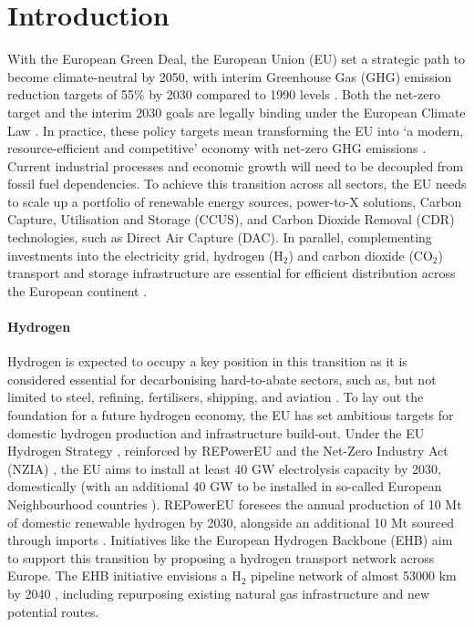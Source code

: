 \documentclass[pdflatex,sn-nature]{sn-jnl}%
\theoremstyle{thmstyleone}%
\theoremstyle{thmstyletwo}%
\theoremstyle{thmstylethree}%
\begin{document}
\section{Introduction}\label{sec1}

With the European Green Deal, the European Union (EU) set a strategic path to become climate-neutral by 2050, with interim Greenhouse Gas (GHG) emission reduction targets of 55\% by 2030 compared to 1990 levels \cite{europeancommissionFit55Delivering2021}. Both the net-zero target and the interim 2030 goals are legally binding under the European Climate Law \cite{europeanparliamentRegulationEU20212021}. In practice, these policy targets mean transforming the EU into `a modern, resource-efficient and competitive' economy with net-zero GHG emissions \cite{europeancommissionEuropeanGreenDeal2021}. Current industrial processes and economic growth will need to be decoupled from fossil fuel dependencies. To achieve this transition across all sectors, the EU needs to scale up a portfolio of renewable energy sources, power-to-X solutions, Carbon Capture, Utilisation and Storage (CCUS), and Carbon Dioxide Removal (CDR) technologies, such as Direct Air Capture (DAC). In parallel, complementing investments into the electricity grid, hydrogen (H$_2$) and carbon dioxide (CO$_2$) transport and storage infrastructure are essential for efficient distribution across the European continent \cite{hofmannH2CO2Network2025}.

\paragraph{Hydrogen}
Hydrogen is expected to occupy a key position in this transition as it is considered essential for decarbonising hard-to-abate sectors, such as, but not limited to steel, refining, fertilisers, shipping, and aviation \cite{beresWillHydrogenSynthetic2024,neumannPotentialRoleHydrogen2023}. To lay out the foundation for a future hydrogen economy, the EU has set ambitious targets for domestic hydrogen production and infrastructure build-out. Under the EU Hydrogen Strategy \cite{europeancommissionCommunicationCommissionEuropean2020}, reinforced by REPowerEU \cite{europeancommissionREPowerEUPlanCommunication2022} and the Net-Zero Industry Act (NZIA) \cite{europeanparliamentRegulationEU20242024}, the EU aims to install at least 40 GW electrolysis capacity by 2030, domestically (with an additional 40 GW to be installed in so-called European Neighbourhood countries \cite{europeanparliamentRegulationEU20212021a}). REPowerEU foresees the annual production of 10 Mt of domestic renewable hydrogen by 2030, alongside an additional 10 Mt sourced through imports \cite{europeancommissionREPowerEUPlanCommunication2022}. Initiatives like the European Hydrogen Backbone (EHB) aim to support this transition by proposing a hydrogen transport network across Europe. The EHB initiative envisions a H$_2$ pipeline network of almost 53000 km by 2040 \cite{europeanhydrogenbackboneinitiativeEuropeanHydrogenBackbone2022}, including repurposing existing natural gas infrastructure and new potential routes.
\end{document}
